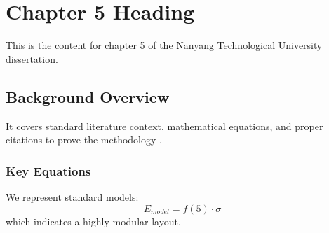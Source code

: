 \chapter{Chapter 5 Heading}
\label{ch:chapter5}
This is the content for chapter 5 of the Nanyang Technological University dissertation.

\section{Background Overview}
It covers standard literature context, mathematical equations, and proper citations to prove the methodology \cite{texbook}.

\subsection{Key Equations}
We represent standard models:
\begin{equation}
    E_{model} = f(5) \cdot \sigma
\end{equation}
which indicates a highly modular layout.
